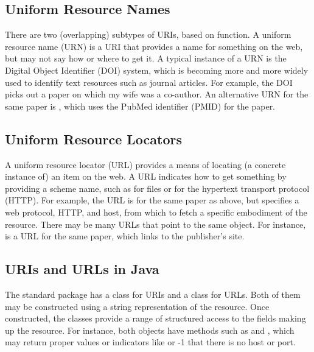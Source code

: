 \subsection{Uniform Resource Names}

There are two (overlapping) subtypes of URIs, based on function.  A
uniform resource name (URN) is a URI that provides a name for
something on the web, but may not say how or where to get it.  A
typical instance of a URN is the Digital Object Identifier (DOI)
system, which is becoming more and more widely used to identify text
resources such as journal articles.  For example, the DOI
 picks out a paper on which my
wife was a co-author.  An alternative URN for the same paper is
, which uses the PubMed identifier (PMID) for the
paper.

\subsection{Uniform Resource Locators}

A uniform resource locator (URL) provides a means of locating (a
concrete instance of) an item on the web.  A URL indicates how to get
something by providing a scheme name, such as  for files
or  for the hypertext transport protocol (HTTP).  For
example, the URL
 is for the same
paper as above, but specifies a web protocol, HTTP, and host,
 from which to fetch a specific embodiment of
the resource.  There may be many URLs that point to the same object.
For instance, 
is a URL for the same paper, which links to the publisher's site.

\subsection{URIs and URLs in Java}

The standard  package has a class  for URIs
and a class  for URLs.  Both of them may be constructed
using a string representation of the resource.  Once constructed, the
classes provide a range of structured access to the fields making up
the resource.  For instance, both objects have methods such as
 and , which may return proper values
or indicators like  or -1 that there is no host or port.

